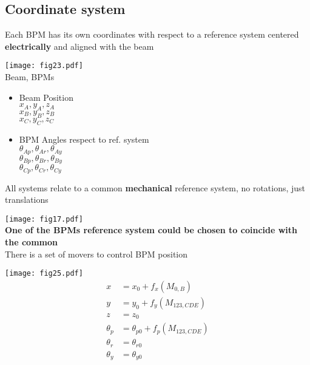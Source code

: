 \subsection{Coordinate system}\par
Each BPM has its own coordinates with respect to a reference system centered \textbf{electrically} and aligned with the beam\par
\vspace*{0.5cm}
\begin{minipage}{7cm}
  \texttt{[image: fig23.pdf]}\\
  {\color{red}Beam}, {\color{forestgreen} BPMs}\\
\end{minipage}
\begin{minipage}{7cm}
\begin{itemize}
 \item Beam Position
 \\$x_A,y_A,z_A$\\$x_B,y_B,z_B$\\$x_C,y_C,z_C$
 \item BPM Angles respect to ref. system\\
 $\theta_{Ap},\theta_{Ar},\theta_{Ay}$\\
 $\theta_{Bp},\theta_{Br},\theta_{By}$\\
 $\theta_{Cp},\theta_{Cr},\theta_{Cy}$
\end{itemize}
\end{minipage}\par
All systems relate to a common \textbf{mechanical} reference system, no rotations, just translations\par
\centering
\texttt{[image: fig17.pdf]}\\
\textbf{One of the BPMs reference system could be chosen to coincide with the common}\\
There is a set of movers to control BPM position\par
\centering
\texttt{[image: fig25.pdf]} 
\begin{align*}
 x &= x_0+f_x(M_{0,B})\\
 y &= y_0+f_y(M_{123,CDE})\\
 z &= z_0\\
 \theta_p &= \theta_{p0}+f_p(M_{123,CDE})\\
 \theta_r &= \theta_{r0}\\
 \theta_y &= \theta_{y0}
\end{align*}\par
